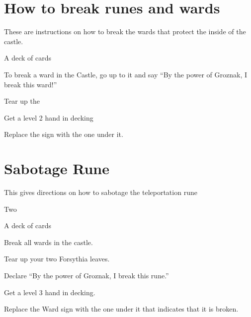 \documentclass[green]{guildcamp2}
\begin{document}
\name{\gClericBreak{}}

\section{How to break runes and wards}
These are instructions on how to break the wards that protect the inside of the castle.

\begin{enum}[Requirements]
	\item \iHolyBook{}
	\item \iForsythia{}
	\item A deck of cards
\end{enum}
	
\begin{enum}[Directions]
	\item To break a ward in the Castle, go up to it and say "`By the power of Groznak, I break this ward!"'
	\item Tear up the \iForsythia{}
	\item Get a level 2 hand in decking
	\item Replace the sign with the one under it.
\end{enum}

\clearpage
\section{Sabotage Rune}
This gives directions on how to sabotage the teleportation rune

\begin{enum}[Requirements]
	\item Two \iForsythia{}
	\item \iHolyBook {}
	\item A deck of cards
\end{enum}

\begin{enum}[Directions]
	\item Break all wards in the castle.
	\item Tear up your two Forsythia leaves.
	\item Declare ``By the power of Groznak, I break this rune.''
	\item Get a level 3 hand in decking.
	\item Replace the Ward sign with the one under it that indicates that it is broken.
\end{enum}
	
\end{document}
